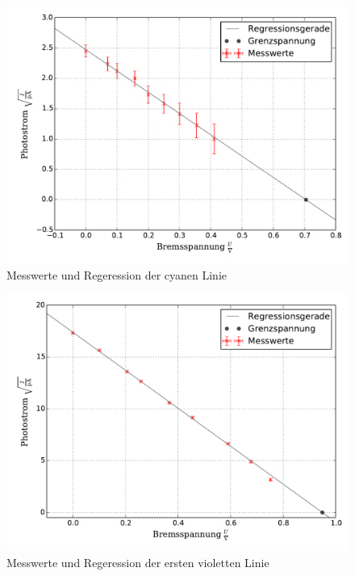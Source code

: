 		\begin{figure}[!h]
			\centering
			\includegraphics[scale=0.7]{Grafiken/Cyan.pdf}
			\caption{Messwerte und Regeression der cyanen Linie \label{fig:Messwerte_Cyan}}
		\end{figure}
		\begin{figure}[!h]
			\centering
			\includegraphics[scale=0.7]{Grafiken/Violett1.pdf}
			\caption{Messwerte und Regeression der ersten violetten Linie \label{fig:Messwerte_Violett1}}
		\end{figure}
